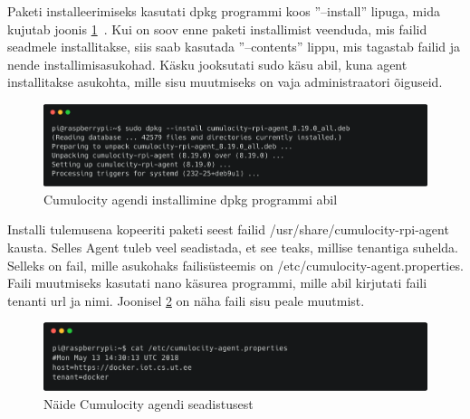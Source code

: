 \documentclass[12pt]{article}
\begin{document}
  \FloatBarrier
 
 
  Paketi installeerimiseks kasutati dpkg programmi koos ''--install'' lipuga, mida kujutab
  joonis \ref{fig:dpkg_install}~\cite{dpkg}.
  Kui on soov enne paketi installimist veenduda, mis failid seadmele installitakse, siis saab
  kasutada ''--contents'' lippu, mis tagastab failid ja nende installimisasukohad. Käsku
  jooksutati sudo käsu abil, kuna agent installitakse asukohta, mille sisu muutmiseks on
  vaja administraatori õiguseid.
 
  \begin{figure} [ht] %
  \begin{center}
  \includegraphics[width=1.0\textwidth]{dpkg_install}
  \caption{Cumulocity agendi installimine dpkg programmi abil}
  \label{fig:dpkg_install}
  \end{center}
  \end{figure}
 
  \FloatBarrier
 
 
  Installi tulemusena kopeeriti paketi seest failid /usr/share/cumulocity-rpi-agent kausta. Selles
  Agent tuleb veel seadistada, et see teaks, millise tenantiga suhelda. Selleks on fail, mille
  asukohaks failisüsteemis on /etc/cumulocity-agent.properties. Faili muutmiseks kasutati
  nano käsurea programmi, mille abil kirjutati faili tenanti url ja nimi. Joonisel
  \ref{fig:agent_configuration} on näha faili sisu peale muutmist.
 
  \begin{figure} [ht] %
  \begin{center}
  \includegraphics[width=1.0\textwidth]{agent_configuration}
  \caption{Näide Cumulocity agendi seadistusest}
  \label{fig:agent_configuration}
  \end{center}
  \end{figure}
 
\end{document}
